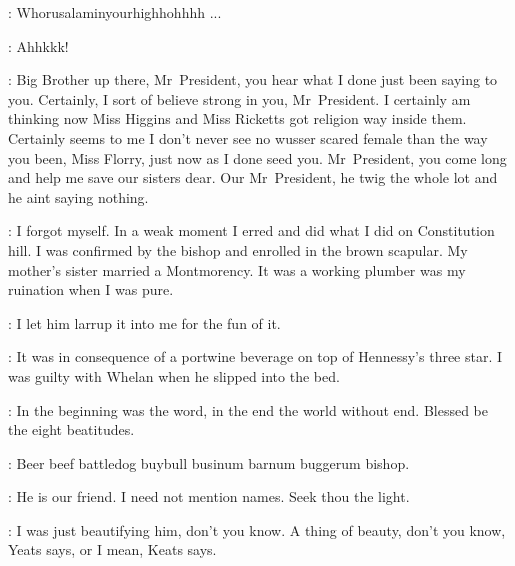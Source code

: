 \Gramophone:
Whorusalaminyourhighhohhhh ...

\ThreeWhores:
Ahhkkk!

\Elijah:
Big Brother up there, Mr~President,
you hear what I done just been saying to you.
Certainly, I sort of believe strong in you, Mr~President.
I certainly am thinking now
Miss Higgins and Miss Ricketts got religion way inside them.
Certainly seems to me I don't never see no wusser scared female
than the way you been, Miss Florry, just now as I done seed you.
Mr~President, you come long and help me save our sisters dear.
Our Mr~President, he twig the whole lot and he aint saying nothing.

\KittyKate:
I forgot myself.
In a weak moment I erred and did what I did on Constitution hill.
I was confirmed by the bishop and enrolled in the brown scapular.
My mother's sister married a Montmorency.
It was a working plumber was my ruination when I was pure.

\ZoeFanny:
I let him larrup it into me for the fun of it.

\FlorryTeresa:
It was in consequence of a portwine beverage on top of Hennessy's three star.
I was guilty with Whelan when he slipped into the bed.

\Stephen:
In the beginning was the word, in the end the world without end.
Blessed be the eight beatitudes.


\Beatitudes:
Beer beef battledog buybull businum barnum buggerum bishop.

\Lyster:
He is our friend.
I need not mention names.
Seek thou the light.


\Best:
I was just beautifying him, don't you know.
A thing of beauty, don't you know,
Yeats says, or I mean, Keats says.

